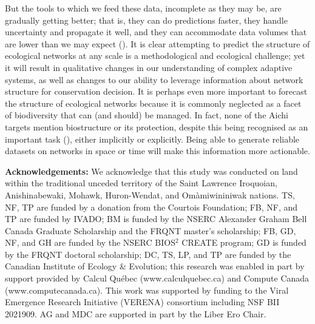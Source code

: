 \begin{refsection}
But the tools to which we feed these data, incomplete as they may be,
are gradually getting better; that is, they can do predictions faster,
they handle uncertainty and propagate it well, and they can accommodate
data volumes that are lower than we may expect (\cite{Pichler2020Machine}).
It is clear attempting to predict the structure of ecological networks
at any scale is a methodological and ecological challenge; yet it will
result in qualitative changes in our understanding of complex adaptive
systems, as well as changes to our ability to leverage information about
network structure for conservation decision. It is perhaps even more
important to forecast the structure of ecological networks because it is
commonly neglected as a facet of biodiversity that can (and should) be
managed. In fact, none of the Aichi targets mention biostructure or its
protection, despite this being recognised as an important task
(\cite{McCann2007Protecting}), either implicitly or explicitly. Being able to
generate reliable datasets on networks in space or time will make this
information more actionable.

\textbf{Acknowledgements:} We acknowledge that this study was conducted
on land within the traditional unceded territory of the Saint Lawrence
Iroquoian, Anishinabewaki, Mohawk, Huron-Wendat, and Omàmiwininiwak
nations. TS, NF, TP are funded by a donation from the Courtois
Foundation; FB, NF, and TP are funded by IVADO; BM is funded by the
NSERC Alexander Graham Bell Canada Graduate Scholarship and the FRQNT
master's scholarship; FB, GD, NF, and GH are funded by the NSERC
BIOS\(^2\) CREATE program; GD is funded by the FRQNT doctoral
scholarship; DC, TS, LP, and TP are funded by the Canadian Institute of
Ecology \& Evolution; this research was enabled in part by support
provided by Calcul Québec (www.calculquebec.ca) and Compute Canada
(www.computecanada.ca). This work was supported by funding to the Viral
Emergence Research Initiative (VERENA) consortium including NSF BII
2021909. AG and MDC are supported in part by the Liber Ero Chair.

\printbibliography
\end{refsection}

\endinput
